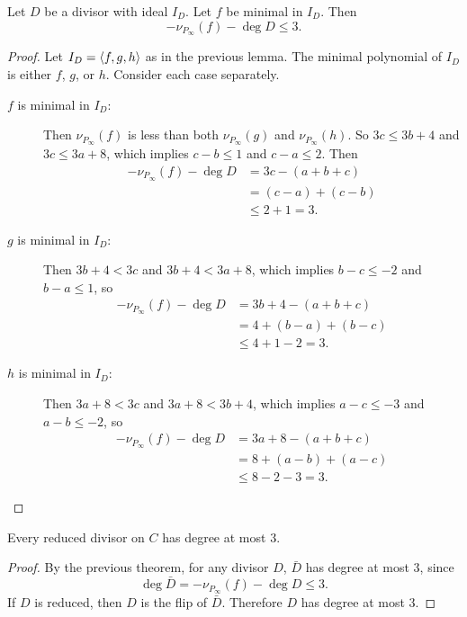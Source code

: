 \begin{theorem}
  Let $D$ be a divisor with ideal $I_D$.
  Let $f$ be minimal in $I_D$. Then
  \[ -\nu_{P_\infty}(f) - \deg D \leq 3. \]
\end{theorem}
\begin{proof}
  Let $I_D = \left\langle f, g, h \right\rangle$ as in the previous lemma.
  The minimal polynomial of $I_D$ is either $f$, $g$, or $h$.
  Consider each case separately.
  \begin{description}
    \item[$f$ is minimal in $I_D$:]
      Then $\nu_{P_\infty}(f)$ is less than both $\nu_{P_\infty}(g)$ and $\nu_{P_\infty}(h)$.
      So $3c \leq 3b + 4$ and $3c \leq 3a + 8$, which implies
      $c - b \leq 1$ and $c - a \leq 2$. Then
      \begin{align*}
        -\nu_{P_\infty}(f) - \deg D
          &= 3c - (a + b + c) \\
          &= (c - a) + (c - b) \\
          &\leq 2 + 1 = 3.
      \end{align*}
      
    \item[$g$ is minimal in $I_D$:]
      Then $3b + 4 < 3c$ and $3b + 4 < 3a + 8$,
      which implies $b - c \leq -2$ and $b - a \leq 1$, so
      \begin{align*}
        -\nu_{P_\infty}(f) - \deg D
          &= 3b + 4 - (a + b + c) \\
          &= 4 + (b - a) + (b - c) \\
          &\leq 4 + 1 - 2 = 3.
      \end{align*}

    \item[$h$ is minimal in $I_D$:]
      Then $3a + 8 < 3c$ and $3a + 8 < 3b + 4$,
      which implies $a - c \leq -3$ and $a - b \leq -2$, so
      \begin{align*}
        -\nu_{P_\infty}(f) - \deg D
          &= 3a + 8 - (a + b + c) \\
          &= 8 + (a - b) + (a - c) \\
          &\leq 8 - 2 - 3 = 3.
      \end{align*}
  \end{description}
\end{proof}

\begin{theorem}
  Every reduced divisor on $C$ has degree at most 3.
\end{theorem}
\begin{proof}
  By the previous theorem, for any divisor $D$, $\bar D$ has degree at most 3, since
  \[ \deg \bar D = -\nu_{P_\infty}(f) - \deg D \leq 3. \]
  If $D$ is reduced, then $D$ is the flip of $\bar D$.
  Therefore $D$ has degree at most 3.
\end{proof}
